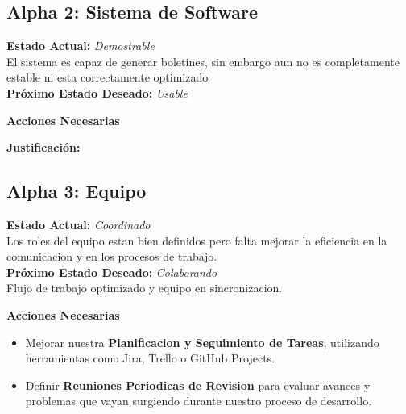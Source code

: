 \documentclass[12pt]{article}
\begin{document}
\vspace{0.3cm}

\subsection{Alpha 2: Sistema de Software}


\textbf{Estado Actual:} \textit{Demostrable} \\
\hspace*{1cm} El sistema es capaz de generar boletines, sin embargo aun
no es completamente estable ni esta correctamente optimizado \\
\textbf{Próximo Estado Deseado:} \textit{Usable} \\
\hspace*{1cm}

\vspace{0.1cm}

\textbf{Acciones Necesarias}


\vspace{0.1cm}

\textbf{Justificación:}

\vspace{0.3cm}

\subsection{Alpha 3: Equipo}


\textbf{Estado Actual:} \textit{Coordinado} \\
\hspace*{1cm} Los roles del equipo estan bien definidos
pero falta mejorar la eficiencia en la
comunicacion y en los procesos de trabajo. \\
\textbf{Próximo Estado Deseado:} \textit{Colaborando} \\
\hspace*{1cm} Flujo de trabajo optimizado y equipo en
sincronizacion.

\vspace{0.1cm}

\textbf{Acciones Necesarias}
\begin{itemize}
    \item Mejorar nuestra \textbf{Planificacion y Seguimiento de Tareas},
          utilizando herramientas como Jira, Trello o GitHub Projects.
    \item Definir \textbf{Reuniones Periodicas de Revision}
          para evaluar avances y problemas que vayan surgiendo
          durante nuestro proceso de desarrollo.
\end{itemize}
\end{document}
